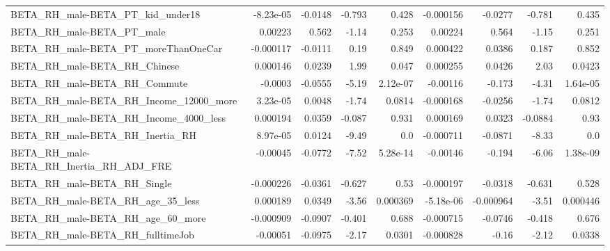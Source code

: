 \begin{tabular}{lrrrrrrrr}
BETA\_RH\_male-BETA\_PT\_kid\_under18                   &   -8.23e-05 &      -0.0148 &   -0.793 &    0.428 &  -0.000156 &     -0.0277 &       -0.781 &         0.435 \\
BETA\_RH\_male-BETA\_PT\_male                          &     0.00223 &        0.562 &    -1.14 &    0.253 &    0.00224 &       0.564 &        -1.15 &         0.251 \\
BETA\_RH\_male-BETA\_PT\_moreThanOneCar                &   -0.000117 &      -0.0111 &     0.19 &    0.849 &   0.000422 &      0.0386 &        0.187 &         0.852 \\
BETA\_RH\_male-BETA\_RH\_Chinese                       &    0.000146 &       0.0239 &     1.99 &    0.047 &   0.000255 &      0.0426 &         2.03 &        0.0423 \\
BETA\_RH\_male-BETA\_RH\_Commute                       &     -0.0003 &      -0.0555 &    -5.19 & 2.12e-07 &   -0.00116 &      -0.173 &        -4.31 &      1.64e-05 \\
BETA\_RH\_male-BETA\_RH\_Income\_12000\_more             &    3.23e-05 &       0.0048 &    -1.74 &   0.0814 &  -0.000168 &     -0.0256 &        -1.74 &        0.0812 \\
BETA\_RH\_male-BETA\_RH\_Income\_4000\_less              &    0.000194 &       0.0359 &   -0.087 &    0.931 &   0.000169 &      0.0323 &      -0.0884 &          0.93 \\
BETA\_RH\_male-BETA\_RH\_Inertia\_RH                    &    8.97e-05 &       0.0124 &    -9.49 &      0.0 &  -0.000711 &     -0.0871 &        -8.33 &           0.0 \\
BETA\_RH\_male-BETA\_RH\_Inertia\_RH\_ADJ\_FRE            &    -0.00045 &      -0.0772 &    -7.52 & 5.28e-14 &   -0.00146 &      -0.194 &        -6.06 &      1.38e-09 \\
BETA\_RH\_male-BETA\_RH\_Single                        &   -0.000226 &      -0.0361 &   -0.627 &     0.53 &  -0.000197 &     -0.0318 &       -0.631 &         0.528 \\
BETA\_RH\_male-BETA\_RH\_age\_35\_less                   &    0.000189 &       0.0349 &    -3.56 & 0.000369 &  -5.18e-06 &   -0.000964 &        -3.51 &      0.000446 \\
BETA\_RH\_male-BETA\_RH\_age\_60\_more                   &   -0.000909 &      -0.0907 &   -0.401 &    0.688 &  -0.000715 &     -0.0746 &       -0.418 &         0.676 \\
BETA\_RH\_male-BETA\_RH\_fulltimeJob                   &    -0.00051 &      -0.0975 &    -2.17 &   0.0301 &  -0.000828 &       -0.16 &        -2.12 &        0.0338 \\

\end{tabular}
